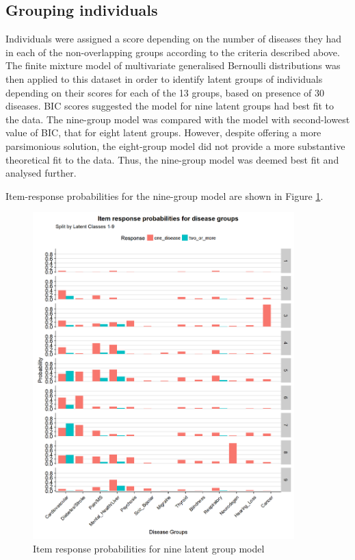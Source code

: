 \documentclass[12pt,]{report}
\begin{document}
\subsection{Grouping individuals}\label{subsec:clust-clustering}

Individuals were assigned a score depending on the number of diseases
they had in each of the non-overlapping groups according to the criteria
described above. The finite mixture model of multivariate generalised
Bernoulli distributions was then applied to this dataset in order to
identify latent groups of individuals depending on their scores for each
of the 13 groups, based on presence of 30 diseases. BIC scores suggested
the model for nine latent groups had best fit to the data. The
nine-group model was compared with the model with second-lowest value of
BIC, that for eight latent groups. However, despite offering a more
parsimonious solution, the eight-group model did not provide a more
substantive theoretical fit to the data. Thus, the nine-group model was
deemed best fit and analysed further.

Item-response probabilities for the nine-group model are shown in Figure
\ref{fig:item-response}.

\begin{figure}
  \centering
    \includegraphics[width=0.9\textwidth]{figures/item-response.png}
  \caption{Item response probabilities for nine latent group model}
  \label{fig:item-response}
\end{figure}
\end{document}
